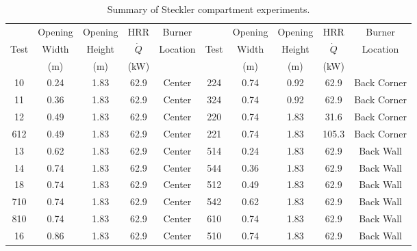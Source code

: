 \begin{table}[h!]
\caption{Summary of Steckler compartment experiments.}
\begin{center}
\begin{tabular}{|c|c|c|c|c||c|c|c|c|c|}
\hline
        & Opening   & Opening       &  HRR       & Burner       &       & Opening   & Opening     &  HRR         & Burner        \\
Test    & Width     & Height        & $\dot{Q}$  & Location     & Test  & Width     & Height      & $\dot{Q}$    & Location      \\
        & (m)       & (m)           & (kW)       &              &       & (m)       &  (m)        & (kW)         &                \\ \hline \hline
10      & 0.24      & 1.83          &  62.9      & Center       & 224   & 0.74      & 0.92        &  62.9         & Back Corner         \\ \hline
11      & 0.36      & 1.83          &  62.9      & Center       & 324   & 0.74      & 0.92        &  62.9         & Back Corner         \\ \hline
12      & 0.49      & 1.83          &  62.9      & Center       & 220   & 0.74      & 1.83        &  31.6         & Back Corner         \\ \hline
612     & 0.49      & 1.83          &  62.9      & Center       & 221   & 0.74      & 1.83        &  105.3        & Back Corner         \\ \hline
13      & 0.62      & 1.83          &  62.9      & Center       & 514   & 0.24      & 1.83        &  62.9         & Back Wall           \\ \hline
14      & 0.74      & 1.83          &  62.9      & Center       & 544   & 0.36      & 1.83        &  62.9         & Back Wall           \\ \hline
18      & 0.74      & 1.83          &  62.9      & Center       & 512   & 0.49      & 1.83        &  62.9         & Back Wall           \\ \hline
710     & 0.74      & 1.83          &  62.9      & Center       & 542   & 0.62      & 1.83        &  62.9         & Back Wall           \\ \hline
810     & 0.74      & 1.83          &  62.9      & Center       & 610   & 0.74      & 1.83        &  62.9         & Back Wall           \\ \hline
16      & 0.86      & 1.83          &  62.9      & Center       & 510   & 0.74      & 1.83        &  62.9         & Back Wall           \\ \hline

\end{tabular}
\end{center}
\end{table}
